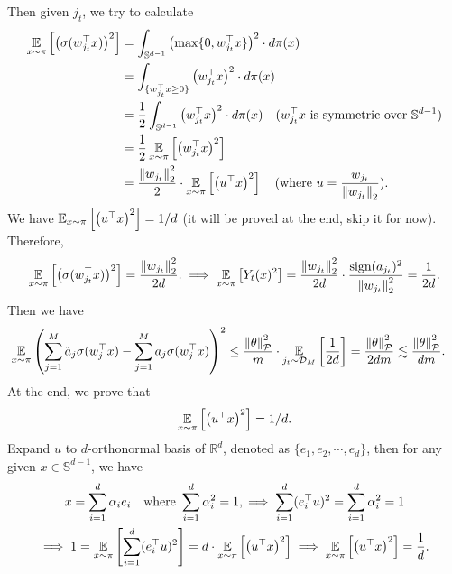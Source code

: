 \begin{answer}
    Then given $j_t$, we try to calculate 
    \begin{align*}
        \operatorname*{\mathbb{E}}_{x\sim \pi}\left[\left(\sigma(w_{j_t}^\top x)\right)^2\right] &= \int_{\mathbb{S}^{d-1}} \left(\max\{0, w_{j_t}^\top x\}\right)^2 \cdot d\pi(x) \\
        &= \int_{\{w_{j_t}^\top x \ge 0\}} \left(w_{j_t}^\top x\right)^2 \cdot d\pi(x) \\
        &= \frac{1}{2} \int_{\mathbb{S}^{d-1}} \left(w_{j_t}^\top x\right)^2 \cdot d\pi(x) \quad \text{($w_{j_t}^\top x$ is symmetric over $\mathbb{S}^{d-1}$)} \\
        &= \frac{1}{2} \operatorname*{\mathbb{E}}_{x\sim \pi} \left[\left(w_{j_t}^\top x\right)^2\right] \\
        &= \frac{\norm{w_{j_t}}_2^2}{2} \cdot \operatorname*{\mathbb{E}}_{x\sim \pi} \left[\left(u^\top x\right)^2\right] \quad \text{(where $u = \frac{w_{j_t}}{\norm{w_{j_t}}_2}$)}.
    \end{align*}
    We have $\operatorname*{\mathbb{E}}_{x\sim \pi} \left[\left(u^\top x\right)^2\right] = 1/d$ (it will be proved at the end, skip it for now). Therefore,
    \begin{align*}
        \operatorname*{\mathbb{E}}_{x\sim \pi}\left[\left(\sigma(w_{j_t}^\top x)\right)^2\right] = \frac{\norm{w_{j_t}}_2^2}{2d}. \implies \operatorname*{\mathbb{E}}_{x\sim \pi}\left[Y_t(x)^2\right] = \frac{\norm{w_{j_t}}_2^2}{2d} \cdot \frac{\text{sign}(a_{j_t})^2}{\norm{w_{j_t}}_2^2} = \frac{1}{2d}.
    \end{align*}
    Then we have
    \begin{align*}
        \operatorname*{\mathbb{E}}_{x\sim \pi} \left( \sum_{j=1}^M \tilde{a}_j \sigma(w_j^{\top} x) - \sum_{j=1}^M a_j \sigma(w_j^{\top} x) \right)^2 &\le \frac{\norm{\theta}_{\mathcal{P}}^2}{m} \cdot  \operatorname*{\mathbb{E}}_{j_t\sim \mathcal{D}_M}\left[\frac{1}{2d}\right] = \frac{\norm{\theta}_{\mathcal{P}}^2}{2dm} \lesssim \frac{\norm{\theta}_{\mathcal{P}}^2}{dm}.
    \end{align*}
    At the end, we prove that 
    \[
        \operatorname*{\mathbb{E}}_{x\sim \pi} \left[\left(u^\top x\right)^2\right] = 1/d.
    \]
    Expand $u$ to $d$-orthonormal basis of $\mathbb{R}^d$, denoted as $\{e_1, e_2, \cdots, e_d\}$, then for any given $x \in \mathbb{S}^{d-1}$, we have
    \begin{gather*}
        x = \sum_{i=1}^d \alpha_i e_i \quad \text{where } \sum_{i=1}^d \alpha_i^2 = 1, \implies \sum_{i=1}^{d} (e_i^\top u)^2 = \sum_{i=1}^{d} \alpha_i^2 = 1 \\
        \implies 1 = \operatorname*{\mathbb{E}}_{x\sim \pi} \left[\sum_{i=1}^{d} (e_i^\top u)^2 \right] = d \cdot \operatorname*{\mathbb{E}}_{x\sim \pi} \left[\left(u^\top x\right)^2\right]  \implies \operatorname*{\mathbb{E}}_{x\sim \pi} \left[\left(u^\top x\right)^2\right] = \frac{1}{d}.
    \end{gather*}
    \ed
\end{answer}